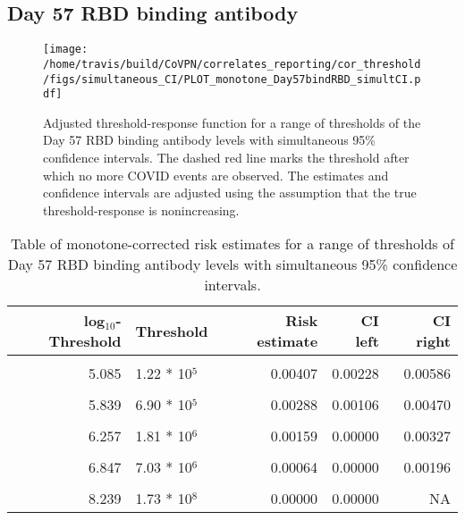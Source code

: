 \documentclass[]{book}
\theoremstyle{definition}
\theoremstyle{definition}
\theoremstyle{definition}
\newcommand{\1}{\mathbbm{1}}
\begin{document}
\newpage

\newpage

\newpage

\hypertarget{day-57-rbd-binding-antibody-3}{%
\subsection{Day 57 RBD binding antibody}\label{day-57-rbd-binding-antibody-3}}

\begin{figure}[H]
\centering
\texttt{[image: /home/travis/build/CoVPN/correlates\_reporting/cor\_threshold/figs/simultaneous\_CI/PLOT\_monotone\_Day57bindRBD\_simultCI.pdf]}
\caption{Adjusted threshold-response function for a range of thresholds of the
  Day 57 RBD binding antibody levels with simultaneous 95\% confidence intervals. The dashed red line marks the threshold after which no more COVID events are observed. The estimates and confidence intervals are adjusted using the assumption that the true threshold-response is nonincreasing.}
\end{figure}
\begin{table}[!h]

\caption{\label{tab:unnamed-chunk-397}Table of monotone-corrected risk estimates for a range of thresholds of Day 57 RBD binding antibody levels with simultaneous 95\% confidence intervals.}
\centering
\begin{tabular}[t]{rlrrr}
\toprule
log$_{10}$-Threshold & Threshold & Risk estimate & CI left & CI right\\
\midrule
\cellcolor{gray!6}{4.062} & \cellcolor{gray!6}{1.15 * 10$^4$} & \cellcolor{gray!6}{0.00490} & \cellcolor{gray!6}{0.00302} & \cellcolor{gray!6}{0.00677}\\
5.085 & 1.22 * 10$^5$ & 0.00407 & 0.00228 & 0.00586\\
\cellcolor{gray!6}{5.507} & \cellcolor{gray!6}{3.21 * 10$^5$} & \cellcolor{gray!6}{0.00377} & \cellcolor{gray!6}{0.00188} & \cellcolor{gray!6}{0.00565}\\
5.839 & 6.90 * 10$^5$ & 0.00288 & 0.00106 & 0.00470\\
\cellcolor{gray!6}{6.048} & \cellcolor{gray!6}{1.12 * 10$^6$} & \cellcolor{gray!6}{0.00238} & \cellcolor{gray!6}{0.00056} & \cellcolor{gray!6}{0.00420}\\
6.257 & 1.81 * 10$^6$ & 0.00159 & 0.00000 & 0.00327\\
\cellcolor{gray!6}{6.499} & \cellcolor{gray!6}{3.16 * 10$^6$} & \cellcolor{gray!6}{0.00124} & \cellcolor{gray!6}{0.00000} & \cellcolor{gray!6}{0.00304}\\
6.847 & 7.03 * 10$^6$ & 0.00064 & 0.00000 & 0.00196\\
\cellcolor{gray!6}{7.181} & \cellcolor{gray!6}{1.52 * 10$^7$} & \cellcolor{gray!6}{0.00064} & \cellcolor{gray!6}{0.00000} & \cellcolor{gray!6}{0.00341}\\
8.239 & 1.73 * 10$^8$ & 0.00000 & 0.00000 & NA\\
\bottomrule
\end{tabular}
\end{table}
\end{document}
